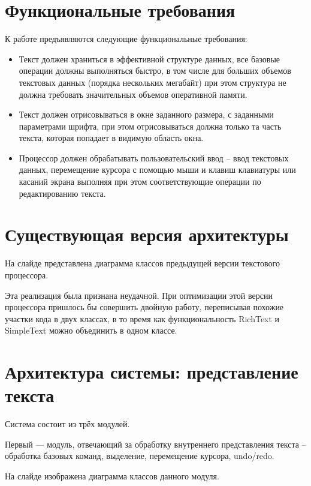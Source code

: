 \documentclass{article}
\begin{document}
    \section{Функциональные требования}
        \par К работе предъявляются следующие функциональные требования:
        \begin{itemize}
            \item Текст должен храниться в эффективной структуре данных, все базовые операции должны 
            выполняться быстро, в том числе для больших объемов текстовых данных (порядка 
            нескольких мегабайт) при этом структура не должна требовать значительных объемов 
            оперативной памяти.
            \item Текст должен отрисовываться в 
            окне заданного размера, с заданными параметрами шрифта, при этом отрисовываться 
            должна только та часть текста, которая попадает в видимую область окна.
            \item Процессор должен обрабатывать 
            пользовательский ввод – ввод текстовых данных, перемещение курсора с помощью мыши и 
            клавиш клавиатуры или касаний экрана выполняя при этом соответствующие операции по 
            редактированию текста.
        \end{itemize}
    \section{Существующая версия архитектуры}
        \par На слайде представлена диаграмма классов предыдущей версии текстового процессора.
        \par Эта реализация была признана неудачной. При оптимизации этой версии процессора 
        пришлось бы совершить двойную работу, переписывая похожие участки кода в двух классах, 
        в то время как функциональность RichText и SimpleText можно объединить в одном классе.
    \section{Архитектура системы: представление текста}
        \par Система состоит из трёх модулей.
        \par Первый --- модуль, отвечающий за обработку внутреннего представления текста – обработка 
        базовых команд, выделение, перемещение курсора, undo/redo.
        \par На слайде изображена диаграмма классов данного модуля.
\end{document}
